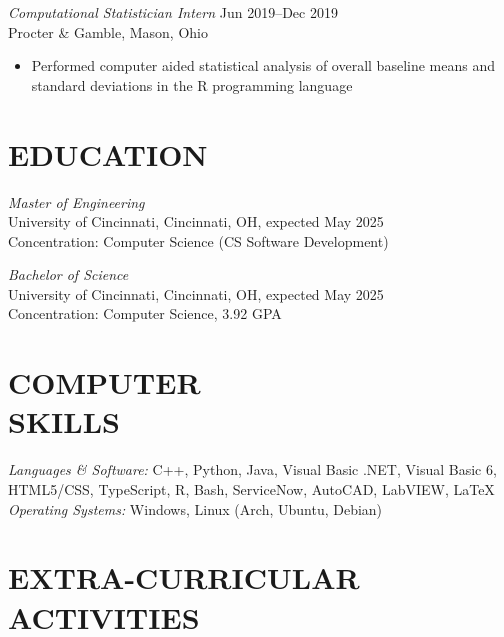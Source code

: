 \documentclass[margin]{res} %
\begin{document}
\begin{resume}
{\sl Computational Statistician Intern} \hfill {\color{black} Jun 2019–Dec 2019} \\
Procter \& Gamble, Mason, Ohio
\begin{itemize} \itemsep -2pt %
\item Performed computer aided statistical analysis of overall baseline means and standard deviations in the R programming language
\end{itemize}


\section{EDUCATION}

{\sl Master of Engineering }\\
University of Cincinnati, Cincinnati, OH, expected May 2025 \\
Concentration: Computer Science (CS Software Development)

{\sl Bachelor of Science}\\
University of Cincinnati, Cincinnati, OH, expected May 2025 \\
Concentration: Computer Science, 3.92 GPA


\section{COMPUTER \\ SKILLS} 

{\sl Languages \& Software:} 
C++, Python, Java, Visual Basic .NET, Visual Basic 6, HTML5/CSS, TypeScript, R, Bash, ServiceNow, AutoCAD, LabVIEW, \LaTeX{} \\
{\sl Operating Systems:} Windows, Linux (Arch, Ubuntu, Debian)


\section{EXTRA-CURRICULAR \\ ACTIVITIES} 


\end{resume}
\end{document}
